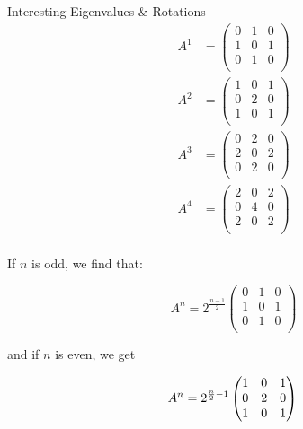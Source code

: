 \begin{answer}
\begin{answerpart}{Interesting Eigenvalues \& Rotations}
    \begin{equation}
      \begin{split}
        A^1 &=
        \begin{pmatrix}
          0 & 1 & 0\\
          1 & 0 & 1\\
          0 & 1 & 0\\
        \end{pmatrix}\\
        A^2 &=
        \begin{pmatrix}
          1 & 0 & 1\\
          0 & 2 & 0\\
          1 & 0 & 1\\
        \end{pmatrix}\\
        A^3 &=
        \begin{pmatrix}
          0 & 2 & 0\\
          2 & 0 & 2\\
          0 & 2 & 0\\
        \end{pmatrix}\\
        A^4 &=
        \begin{pmatrix}
          2 & 0 & 2\\
          0 & 4 & 0\\
          2 & 0 & 2\\
        \end{pmatrix}\\
      \end{split}
    \end{equation}

    If $n$ is odd, we find that:

    \begin{equation}
      A^n = 2^{\frac{n-1}{2}}
      \begin{pmatrix}
        0 & 1 & 0\\
        1 & 0 & 1\\
        0 & 1 & 0\\
      \end{pmatrix}
    \end{equation}

    and if $n$ is even, we get

    \begin{equation}
      A^n = 2^{\frac{n}{2} - 1}
      \begin{pmatrix}
        1 & 0 & 1\\
        0 & 2 & 0\\
        1 & 0 & 1\\
      \end{pmatrix}\\
    \end{equation}


\end{answerpart}
\end{answer}
